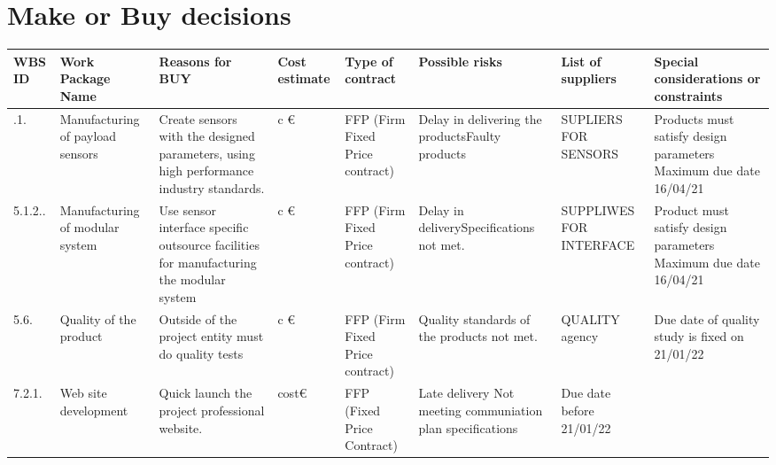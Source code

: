 \section{Make or Buy decisions}

\begin{landscape}
	
	\begin{longtable}[H]{ >{\raggedright\arraybackslash}p{1cm}  >{\raggedright\arraybackslash}p{2.7cm}  >{\raggedright\arraybackslash}p{3.5cm}  >{\raggedright\arraybackslash}p{1.7cm}  >{\raggedright\arraybackslash}p{2cm}  >{\raggedright\arraybackslash}p{2.5cm}  >{\raggedright\arraybackslash}p{2.5cm}  >{\raggedright\arraybackslash}p{4cm}  }
		
		\toprule[2pt]
		
		\textbf{WBS ID} &  \textbf{Work Package Name}  & \textbf{Reasons for BUY} & \textbf{Cost estimate} & \textbf{Type of contract} & \textbf{Possible risks} & \textbf{List of suppliers} & \textbf{Special considerations or constraints} \\
		
		\midrule[1.5pt]
		
		
		
		5.1.1. & Manufacturing of payload sensors & Create sensors with the designed parameters, using high performance industry standards.  & c \euro & FFP (Firm Fixed Price contract) & Delay in delivering the products\newline Faulty products  & SUPLIERS FOR SENSORS & Products must satisfy design parameters \newline Maximum due date 16/04/21  \\
		
		\hline
		
		5.1.2.. & Manufacturing of modular system & Use sensor interface specific outsource facilities for manufacturing the modular system   & c \euro & FFP (Firm Fixed Price contract) & Delay in delivery\newline Specifications not met. & SUPPLIWES FOR INTERFACE & Product must satisfy design parameters \newline Maximum due date 16/04/21 \\
		
		\hline
		
		5.6. & Quality of the product & Outside of the project entity must do  quality tests& c \euro & FFP (Firm Fixed Price contract) & Quality standards of the products not met.& QUALITY agency & Due date of quality study is fixed on 21/01/22\\
		
		\hline
		
		7.2.1.& Web site development & Quick launch the project professional website. & cost\euro & FFP (Fixed Price Contract) & Late delivery \newline Not meeting communiation plan specifications & Due date before 21/01/22\\
		
			
		
		
		\bottomrule[2pt]
	\end{longtable}

\end{landscape}

